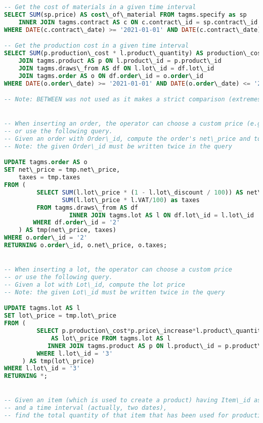 \begin{lstlisting}[language=SQL,
keywordstyle=\color{blue},
stringstyle=\color{mauve},
showstringspaces=false,
basicstyle=\ttfamily\footnotesize]
-- Get the cost of materials in a given time interval
SELECT SUM(sp.price) AS cost\_of\_material FROM tagms.specify as sp
    INNER JOIN tagms.contract AS c ON c.contract\_id = sp.contract\_id
WHERE DATE(c.contract\_date) >= '2021-01-01' AND DATE(c.contract\_date) <= '2021-12-31';

-- Get the production cost in a given time interval
SELECT SUM(p.production\_cost * l.product\_quantity) AS production\_cost FROM tagms.lot AS l
    JOIN tagms.product AS p ON l.product\_id = p.product\_id
    JOIN tagms.draws\_from AS df ON l.lot\_id = df.lot\_id
    JOIN tagms.order AS o ON df.order\_id = o.order\_id
WHERE DATE(o.order\_date) >= '2021-01-01' AND DATE(o.order\_date) <= '2021-12-31';

-- Note: BETWEEN was not used as it makes a strict comparison (extremes excluded)


-- When inserting an order, the operator can choose a custom price (e.g., decided with the customer)
-- or use the following query.
-- Given an order with Order\_id, compute the order's net\_price and total taxes.
-- Note: the given Order\_id must be written twice in the query

UPDATE tagms.order AS o
SET net\_price = tmp.net\_price,
    taxes = tmp.taxes
FROM (
         SELECT SUM(l.lot\_price * (1 - l.lot\_discount / 100)) AS net\_price,
                SUM(l.lot\_price * l.VAT/100) as taxes
         FROM tagms.draws\_from AS df
                  INNER JOIN tagms.lot AS l ON df.lot\_id = l.lot\_id
        WHERE df.order\_id = '2'
    ) AS tmp(net\_price, taxes)
WHERE o.order\_id = '2'
RETURNING o.order\_id, o.net\_price, o.taxes;


-- When inserting a lot, the operator can choose a custom price
-- or use the following query.
-- Given a lot with Lot\_id, compute the lot price
-- Note: the given Lot\_id must be written twice in the query

UPDATE tagms.lot AS l
SET lot\_price = tmp.lot\_price
FROM (
         SELECT p.production\_cost*p.price\_increase*l.product\_quantity
             AS lot\_price FROM tagms.lot AS l
            INNER JOIN tagms.product AS p ON l.product\_id = p.product\_id
         WHERE l.lot\_id = '3'
     ) AS tmp(lot\_price)
WHERE l.lot\_id = '3'
RETURNING *;


-- Given an item (which is used to create a product) having Item\_id as identifier
-- and a time interval (actually, two dates),
-- find the total quantity of that item that has been used for production or packaging during that time.


\end{lstlisting}
